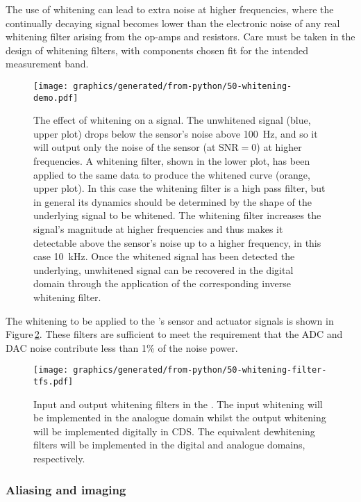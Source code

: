 The use of whitening can lead to extra noise at higher frequencies, where the continually decaying signal becomes lower than the electronic noise of any real whitening filter arising from the op-amps and resistors. Care must be taken in the design of whitening filters, with components chosen fit for the intended measurement band.

\begin{figure}
  \centering
  \texttt{[image: graphics/generated/from-python/50-whitening-demo.pdf]}
  \caption[The effect of whitening on a signal]{\label{fig:whitening}The effect of whitening on a signal. The unwhitened signal (blue, upper plot) drops below the sensor's noise above \SI{100}{\hertz}, and so it will output only the noise of the sensor (at $\text{SNR} = 0$) at higher frequencies. A whitening filter, shown in the lower plot, has been applied to the same data to produce the whitened curve (orange, upper plot). In this case the whitening filter is a high pass filter, but in general its dynamics should be determined by the shape of the underlying signal to be whitened. The whitening filter increases the signal's magnitude at higher frequencies and thus makes it detectable above the sensor's noise up to a higher frequency, in this case \SI{10}{\kilo\hertz}. Once the whitened signal has been detected the underlying, unwhitened signal can be recovered in the digital domain through the application of the corresponding inverse whitening filter.}
\end{figure}

The whitening to be applied to the \SSMEXPT{}'s sensor and actuator signals is shown in Figure\,\ref{fig:whitening-tfs}. These filters are sufficient to meet the requirement that the \gls{ADC} and \gls{DAC} noise contribute less than 1\% of the noise power.

\begin{figure}
  \centering
  \texttt{[image: graphics/generated/from-python/50-whitening-filter-tfs.pdf]}
  \caption[Input and output whitening filters in the \SSMEXPT{}]{\label{fig:whitening-tfs}Input and output whitening filters in the \SSMEXPT{}. The input whitening will be implemented in the analogue domain whilst the output whitening will be implemented digitally in CDS. The equivalent dewhitening filters will be implemented in the digital and analogue domains, respectively.}
\end{figure}

\subsubsection{Aliasing and imaging}

